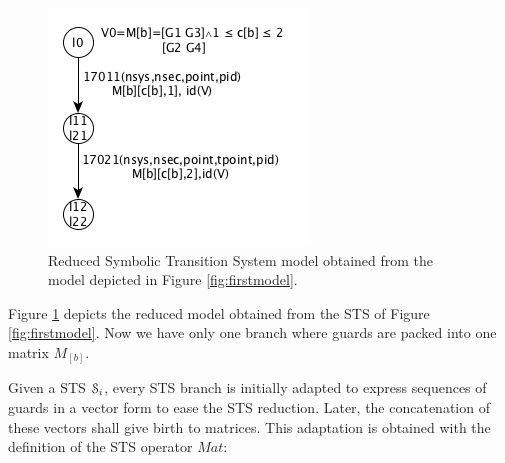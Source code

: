 \begin{figure}[h]
    \includegraphics[width=0.5\linewidth]{figures/STS2.png}

	\caption{Reduced Symbolic Transition System model obtained
    from the model depicted in Figure \ref{fig:firstmodel}.}
	\label{fig:reduced-model}
\end{figure}

Figure \ref{fig:reduced-model} depicts the reduced model obtained
from the STS of Figure \ref{fig:firstmodel}. Now we have only one
branch where guards are packed into one matrix $M_{[b]}$.


Given a STS $\EuScript{S}_i$, every STS branch is initially
adapted to express sequences of guards in a vector form to ease
the STS reduction. Later, the concatenation of these vectors
shall give birth to matrices. This adaptation is obtained with
the definition of the STS operator $Mat$:

